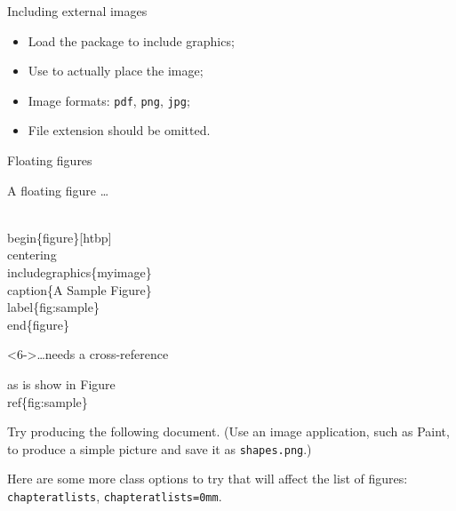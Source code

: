 \begin{frame}[fragile]{Including external images}

  \begin{itemize}
    \item Load the  package to include graphics;
    \item Use  to actually place the image;
    \item Image formats: \texttt{pdf}, \texttt{png}, \texttt{jpg};
    \item File extension should be omitted.
  \end{itemize}
  
  \vspace{1 em}

\end{frame}


\begin{frame}[fragile]{Floating figures}

  \begin{block}{A floating figure \dots}
\begin{semiverbatim}
\\begin\{figure\}\alert<2>{[htbp]}
  \alert<3>{\\centering}
  \\includegraphics\{myimage\}
  \alert<4>{\\caption\{A Sample Figure\}}
  \alert<5>{\\label\{fig:sample\}}
\\end\{figure\}
\end{semiverbatim}
  \end{block}
  
  \begin{block}<6->{\ldots needs a cross-reference}
\begin{semiverbatim}
as is show in Figure~\alert<6>{\\ref\{fig:sample\}}
\end{semiverbatim}
  \end{block}

\end{frame}

\begin{exercise}
  Try producing the following document. (Use an image application,
  such as Paint, to produce a simple picture and save it as
  \texttt{shapes.png}.)
  
  Here are some more class options to try that will affect the list of
  figures: \texttt{chapteratlists}, \texttt{chapteratlists=0mm}.
\end{exercise}

